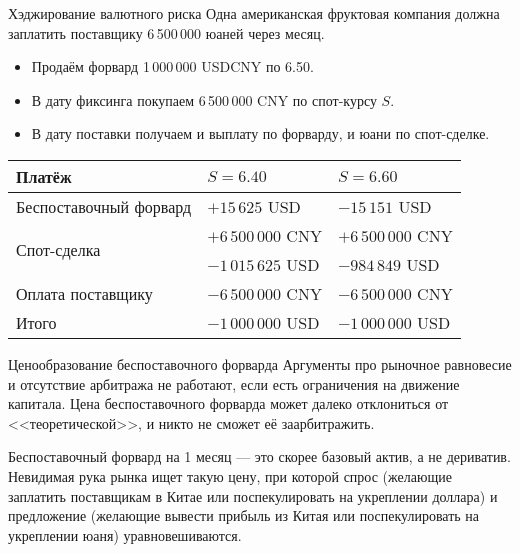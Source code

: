 \documentclass{beamer}
\begin{document}
\begin{frame}{Хэджирование валютного риска}
\justify
Одна американская фруктовая компания должна заплатить поставщику 6\,500\,000 юаней через месяц.
\begin{itemize}
\item Продаём форвард 1\,000\,000 USDCNY по 6.50.
\item В дату фиксинга покупаем 6\,500\,000 CNY по спот-курсу $S$.
\item В дату поставки получаем и выплату по форварду, и юани по спот-сделке.
\end{itemize}

\justify
\centering
\begin{tabular}{l|l|l}
		Платёж 				& $S=6.40$ 			& $S=6.60$ \\
		\hline
		Беспоставочный форвард 	& $+15\,625$ USD 		& $-15\,151$ USD \\
		\hline
		\multirow{2}{*}{Спот-сделка} & $+6\,500\,000$ CNY 	& $+6\,500\,000$ CNY \\
				   			& $-1\,015\,625$ USD		& $-984\,849$ USD \\
		\hline
		Оплата поставщику 		& $-6\,500\,000$ CNY 	& $-6\,500\,000$ CNY \\ 
		 \hline
		Итого				& $-1\,000\,000$ USD 	& $-1\,000\,000$ USD
\end{tabular}
\end{frame}



\begin{frame}{Ценообразование беспоставочного форварда}
\justify
Аргументы про рыночное равновесие и отсутствие арбитража не работают, если есть ограничения на движение капитала. Цена беспоставочного форварда может далеко отклониться от <<теоретической>>, и никто не сможет её заарбитражить.

\justify
Беспоставочный форвард на 1 месяц --- это скорее базовый актив, а не дериватив. Невидимая рука рынка ищет такую цену, при которой спрос (желающие заплатить поставщикам в Китае или поспекулировать на укреплении доллара) и предложение (желающие вывести прибыль из Китая или поспекулировать на укреплении юаня) уравновешиваются.
\end{frame}
\end{document}
